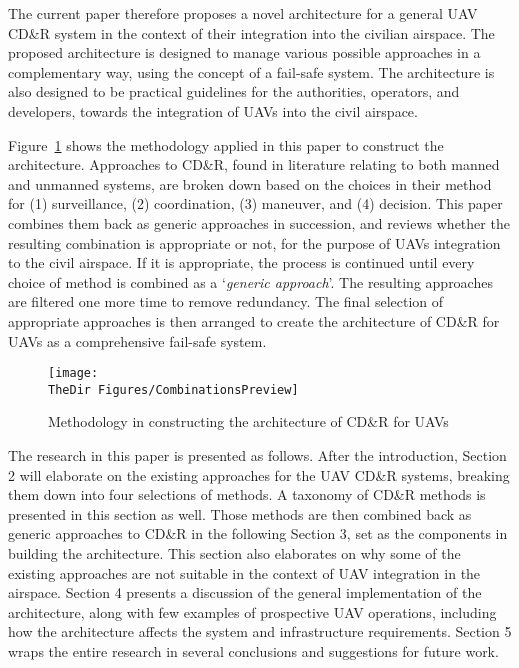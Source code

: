 The current paper therefore proposes a novel architecture for a general UAV CD\&R system in the context of their integration into the civilian airspace. The proposed architecture is designed to manage various possible approaches in a complementary way, using the concept of a fail-safe system. The architecture is also designed to be practical guidelines for the authorities, operators, and developers, towards the integration of UAVs into the civil airspace. 

Figure~\ref{f:CombinationPreview} shows the methodology applied in this paper to construct the architecture. Approaches to CD\&R, found in literature relating to both manned and unmanned systems, are broken down based on the choices in their method for (1) surveillance, (2) coordination, (3) maneuver, and (4) decision. This paper combines them back as generic approaches in succession, and reviews whether the resulting combination is appropriate or not, for the purpose of UAVs integration to the civil airspace. If it is appropriate, the process is continued until every choice of method is combined as a `\textit{generic approach}'. The resulting approaches are filtered one more time to remove redundancy. The final selection of appropriate approaches is then arranged to create the architecture of CD\&R for UAVs as a comprehensive fail-safe system.    

\begin{figure}[h!]
	\centering
	\texttt{[image: \\TheDir Figures/CombinationsPreview]}
	\caption{Methodology in constructing the architecture of CD\&R for UAVs}
	\label{f:CombinationPreview}
\end{figure}

The research in this paper is presented as follows. After the introduction, Section 2 will elaborate on the existing approaches for the UAV CD\&R systems, breaking them down into four selections of methods. A taxonomy of CD\&R methods is presented in this section as well. Those methods are then combined back as generic approaches to CD\&R in the following Section 3, set as the components in building the architecture. This section also elaborates on why some of the existing approaches are not suitable in the context of UAV integration in the airspace. Section 4 presents a discussion of the general implementation of the architecture, along with few examples of prospective UAV operations\cite{degarmo:04}, including how the architecture affects the system and infrastructure requirements. Section 5 wraps the entire research in several conclusions and suggestions for future work. 


